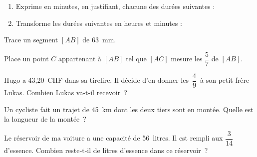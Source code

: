 \begin{exercice}
\begin{enumerate}
 \item Exprime en minutes, en justifiant, chacune des durées suivantes :
 \item Transforme les durées suivantes en heures et minutes :
 \end{enumerate}
\end{exercice}

\begin{exercice}
Trace un segment $[AB]$ de 63 mm.

Place un point $C$ appartenant à $[AB]$ tel que $[AC]$ mesure les $\dfrac{5}{7}$ de $[AB]$.
\end{exercice}


\begin{exercice}[Le partage]
Hugo a 43,20 CHF dans sa tirelire. Il décide d'en donner les $\dfrac{4}{9}$ à son petit frère Lukas. Combien Lukas va-t-il recevoir ?
\end{exercice}


\begin{exercice}[Le cycliste]
Un cycliste fait un trajet de 45 km dont les deux tiers sont en montée. Quelle est la longueur de la montée ?
\end{exercice}


\begin{exercice}[Le réservoir]
Le réservoir de ma voiture a une capacité de 56 litres. Il est rempli aux $\dfrac{3}{14}$ d'essence. Combien reste‑t‑il de litres d'essence dans ce réservoir ?
\end{exercice}


